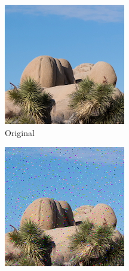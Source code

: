 \documentclass{article}
\begin{document}
\begin{figure}
    \centering
    \begin{subfigure}[b]{0.32\textwidth}
        \centering
        \includegraphics[width=\textwidth]{../Resource/cropped-image.png}
        \caption{Original}
        \label{fig:cropped-image-linear-bsc-original}
    \end{subfigure}
    \hfill
    \begin{subfigure}[b]{0.32\textwidth}
        \centering
        \includegraphics[width=\textwidth]{../Result/cropped-linear-bsc-output.png}

\end{subfigure}
\end{figure}
\end{document}
